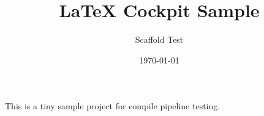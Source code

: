 \documentclass{article}
\title{LaTeX Cockpit Sample}
\author{Scaffold Test}
\date{\today}
\begin{document}
\maketitle

This is a tiny sample project for compile pipeline testing.


\end{document}
